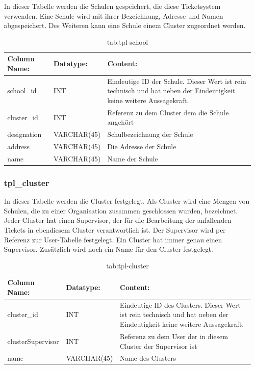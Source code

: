 In dieser Tabelle werden die Schulen gespeichert, die diese Ticketsystem verwenden.
Eine Schule wird mit ihrer Bezeichnung, Adresse und Namen abgespeichert. Des Weiteren kann eine Schule einem Cluster zugeordnet werden. 

\begin{table}[h]
	\begin{tabular}{|p{3.5cm}|p{4cm}|p{6.2cm}|}
		\hline
		\textbf{Column Name:} & \textbf{Datatype:} & \textbf{Content:}\\
		\hline
		school\_id & INT & Eindeutige ID der Schule. Dieser Wert ist rein technisch und hat neben der Eindeutigkeit keine weitere Aussagekraft.\\
		\hline
		cluster\_id & INT & Referenz zu dem Cluster dem die Schule angehört\\
		\hline
		designation & VARCHAR(45) & Schulbezeichnung der Schule\\
		\hline
		address & VARCHAR(45) & Die Adresse der Schule\\
		\hline
		name & VARCHAR(45) & Name der Schule\\
		\hline
	\end{tabular}
	\caption{tab:tpl-school}
\end{table}
\label{tab:tpl_school}

\newpage

\subsubsection{tpl\_cluster}

In dieser Tabelle werden die Cluster festgelegt. Als Cluster wird eine Mengen von Schulen, die zu einer Organisation zusammen geschlossen wurden, bezeichnet. Jeder Cluster hat einen Supervisor, der für die Bearbeitung der anfallenden Tickets in ebendiesem Cluster verantwortlich ist.
Der Supervisor wird per Referenz zur User-Tabelle festgelegt. Ein Cluster hat immer genau einen Supervisor. Zusätzlich wird noch ein Name für den Cluster festgelegt.

\begin{table}[h]
	\begin{tabular}{|p{3.5cm}|p{4cm}|p{6.2cm}|}
		\hline
		\textbf{Column Name:} & \textbf{Datatype:} & \textbf{Content:}\\
		\hline
		cluster\_id & INT & Eindeutige ID des Clusters. Dieser Wert ist rein technisch und hat neben der Eindeutigkeit keine weitere Aussagekraft.\\
		\hline
		clusterSupervisor & INT & Referenz zu dem User der in diesem Cluster der Supervisor ist\\
		\hline
		name & VARCHAR(45) & Name des Clusters\\
		\hline
	\end{tabular}
	\caption{tab:tpl-cluster}
\end{table}
\label{tab:tpl_cluster}

